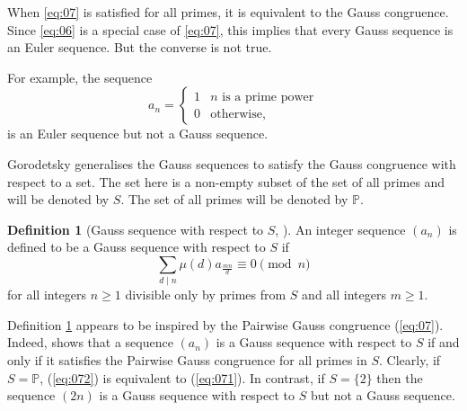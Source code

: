 \documentclass{article}
\numberwithin{equation}{section}
\theoremstyle{definition}
\newtheorem{definition}{\bf {Definition}}[section]
\begin{document}
When \eqref{eq:07} is satisfied for all primes, it is equivalent to the Gauss congruence. Since \eqref{eq:06} is a special case of \eqref{eq:07}, this implies that every Gauss sequence is an Euler sequence. But the converse is not true. 
 
For example, the sequence
\[a_n=\begin{cases}
    1&n\text{ is a prime power}\\
    0&\text{otherwise},
\end{cases}\] is an Euler sequence but not a Gauss sequence.

Gorodetsky \cite{goro_q-gauss} generalises the Gauss sequences to satisfy the Gauss congruence with respect to a set. The set here is a non-empty subset of the set of all primes and will be denoted by $S$. The set of all primes will be denoted by $\mathbb{P}$. 


\begin{definition}[Gauss sequence with respect to $S$, \cite{goro_q-gauss}]\label{def:1} 
    An integer sequence $(a_n)$ is defined to be a Gauss sequence with respect to $S$ if  
    \begin{equation}\label{eq:072}
      \sum_{d\mid n}\mu(d)a_\frac{mn}{d}\equiv0\pmod{n}  
    \end{equation}
    for all integers $n\geq1$ divisible only by primes from $S$ and all integers $m\geq1$.  
\end{definition}

Definition \ref{def:1} appears to be inspired by the Pairwise Gauss congruence (\ref{eq:07}). Indeed, \cite[Lemma 2.1]{goro_q-gauss} shows that a sequence $(a_n)$ is a Gauss sequence with respect to $S$ if and only if it satisfies the Pairwise Gauss congruence for all primes in $S$. Clearly, if $S=\mathbb{P}$, (\ref{eq:072}) is equivalent to (\ref{eq:071}). In contrast, if $S=\{2\}$ then the sequence $(2n)$ is a Gauss sequence with respect to $S$ but not a Gauss sequence.
\end{document}
